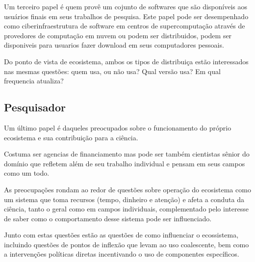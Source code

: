 Um terceiro papel é quem provê um cojunto de softwares que são
disponíveis aos usuários finais em seus trabalhos de pesquisa.
Este papel pode ser desempenhado como ciberinfraestrutura de software
em centros de supercomputação através de provedores de computação
em nuvem ou podem ser distribuidos, podem ser disponiveis para usuarios
fazer download em seus computadores pessoais.

Do ponto de vista de ecosistema, ambos os tipos de distribuiça
estão interessados nas mesmas questões: quem usa, ou não usa?
Qual versão usa? Em qual frequencia atualiza?

\subsection{Pesquisador}

Um último papel é daqueles preocupados sobre o funcionamento do
próprio ecosistema e sua contribuição para a ciência.

Costuma ser agencias de financiamento mas pode ser também cientistas sênior do
domínio que refletem além de seu trabalho individual e pensam em seus campos
como um todo.

As preocupações rondam ao redor de questões sobre operação do ecosistema como
um sistema que toma recursos (tempo, dinheiro e atenção) e afeta a conduta da
ciência, tanto o geral como em campos individuais, complementado pelo interesse
de saber como o comportamento desse sistema pode ser influenciado.


Junto com estas questões estão as questões de como influenciar o ecossistema,
incluindo questões de pontos de inflexão que levam ao uso coalescente, bem como
a intervenções políticas diretas incentivando o uso de componentes específicos.

